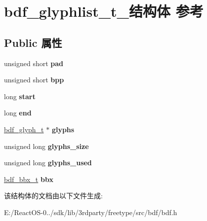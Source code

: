 \hypertarget{structbdf__glyphlist__t__}{}\section{bdf\+\_\+glyphlist\+\_\+t\+\_\+结构体 参考}
\label{structbdf__glyphlist__t__}
\subsection*{Public 属性}
\begin{DoxyCompactItemize}
\item 
\mbox{\label{structbdf__glyphlist__t___adc1416f7c677edc25b261252896ad459}} 
unsigned short {\bfseries pad}
\item 
\mbox{\label{structbdf__glyphlist__t___aec7dca633f95197ee238f528ca78b79c}} 
unsigned short {\bfseries bpp}
\item 
\mbox{\label{structbdf__glyphlist__t___a2acd1ba1e1233e3d3dcd80850da2261b}} 
long {\bfseries start}
\item 
\mbox{\label{structbdf__glyphlist__t___a623e0fbab3dc3190d1f5264b34798b75}} 
long {\bfseries end}
\item 
\mbox{\label{structbdf__glyphlist__t___a81fab83de11dc70f150c97ce57af2bcf}} 
\hyperlink{structbdf__glyph__t__}{bdf\+\_\+glyph\+\_\+t} $\ast$ {\bfseries glyphs}
\item 
\mbox{\label{structbdf__glyphlist__t___a0bbd1d4e4624426165c4e1c48207c240}} 
unsigned long {\bfseries glyphs\+\_\+size}
\item 
\mbox{\label{structbdf__glyphlist__t___a882cc81c1df1cd36a57ba7a56d703e65}} 
unsigned long {\bfseries glyphs\+\_\+used}
\item 
\mbox{\label{structbdf__glyphlist__t___ae158c411febe31bedf7140cbfefb9091}} 
\hyperlink{structbdf__bbx__t__}{bdf\+\_\+bbx\+\_\+t} {\bfseries bbx}
\end{DoxyCompactItemize}


该结构体的文档由以下文件生成\+:\begin{DoxyCompactItemize}
\item 
E\+:/\+React\+O\+S-\/0../sdk/lib/3rdparty/freetype/src/bdf/bdf.\+h\end{DoxyCompactItemize}
